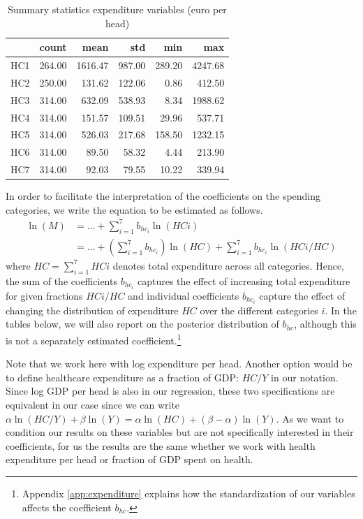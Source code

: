 \documentclass[12pt,english,a4paper]{article}
\begin{document}
\begin{table}[htbp]
\caption{\label{tab:orgf4c8011}Summary statistics expenditure variables (euro per head)}
\centering
\begin{tabular}{lrrrrr}
 & count & mean & std & min & max\\
\hline
HC1 & 264.00 & 1616.47 & 987.00 & 289.20 & 4247.68\\
HC2 & 250.00 & 131.62 & 122.06 & 0.86 & 412.50\\
HC3 & 314.00 & 632.09 & 538.93 & 8.34 & 1988.62\\
HC4 & 314.00 & 151.57 & 109.51 & 29.96 & 537.71\\
HC5 & 314.00 & 526.03 & 217.68 & 158.50 & 1232.15\\
HC6 & 314.00 & 89.50 & 58.32 & 4.44 & 213.90\\
HC7 & 314.00 & 92.03 & 79.55 & 10.22 & 339.94\\
\end{tabular}
\end{table}

In order to facilitate the interpretation of the coefficients on the spending categories, we write the equation to be estimated as follows.
\begin{align}
\label{eq:17}
\ln(M) &= ... + \sum_{i=1}^7 b_{hc_i} \ln(HCi) \\
\label{eq:18}
 &= ... + \left(\sum_{i=1}^7 b_{hc_i} \right) \ln(HC) +  \sum_{i=1}^7 b_{hc_i} \ln(HCi/HC) 
\end{align}
where \(HC =  \sum_{i=1}^7 HCi\) denotes total expenditure across all categories. Hence, the sum of the coefficients \(b_{hc_i}\) captures the effect of increasing total expenditure for given fractions \(HCi/HC\) and individual coefficients \(b_{hc_i}\) capture the effect of changing the distribution of expenditure \(HC\) over the different categories \(i\). In the tables below, we will also report on the posterior distribution of \(b_{hc}\), although this is not a separately estimated coefficient.\footnote{Appendix \ref{app:expenditure} explains how the standardization of our variables affects the coefficient \(b_{hc}\).}

Note that we work here with log expenditure per head. Another option would be to define healthcare expenditure as a fraction of GDP: \(HC/Y\) in our notation. Since log GDP per head is also in our regression, these two specifications are equivalent in our case since we can write \(\alpha \ln(HC/Y) + \beta \ln(Y) = \alpha \ln(HC) + (\beta-\alpha) \ln(Y)\). As we want to condition our results on these variables but are not specifically interested in their coefficients, for us the results are the same whether we work with health expenditure per head or fraction of GDP spent on health.
\end{document}
